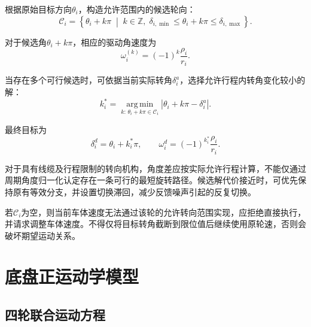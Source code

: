 \documentclass[UTF8,12pt,a4paper,openany]{ctexbook}
\begin{document}
根据原始目标方向$\theta_i$，构造允许范围内的候选轮向：
\begin{equation}
    \mathcal{C}_i
    =
    \left\{
        \theta_i+k\pi
        \;\middle|\;
        k\in\mathbb{Z},\;
        \delta_{i,\min}
        \leq\theta_i+k\pi
        \leq\delta_{i,\max}
    \right\}.
    \label{eq:kc-candidate-set}
\end{equation}

对于候选角$\theta_i+k\pi$，相应的驱动角速度为
\begin{equation}
    \omega_i^{(k)}
    =
    (-1)^k\frac{\rho_i}{r_i}.
    \label{eq:kc-candidate-speed}
\end{equation}

当存在多个可行候选时，可依据当前实际转角$\delta_i^{a}$，选择允许行程内转角变化较小的解：
\begin{equation}
    k_i^{*}
    =
    \underset{
        k:\,\theta_i+k\pi\in\mathcal{C}_i
    }{\operatorname{arg\,min}}
    \left|
        \theta_i+k\pi-\delta_i^{a}
    \right|.
    \label{eq:kc-angle-selection}
\end{equation}

最终目标为
\begin{equation}
    \delta_i^{d}=\theta_i+k_i^{*}\pi,
    \qquad
    \omega_i^{d}
    =
    (-1)^{k_i^{*}}\frac{\rho_i}{r_i}.
    \label{eq:kc-selected-inverse}
\end{equation}

对于具有线缆及行程限制的转向机构，角度差应按实际允许行程计算，不能仅通过周期角度归一化认定存在一条可行的最短旋转路径。候选解代价接近时，可优先保持原有等效分支，并设置切换滞回，减少反馈噪声引起的反复切换。

若$\mathcal{C}_i$为空，则当前车体速度无法通过该轮的允许转向范围实现，应拒绝直接执行，并请求调整车体速度。不得仅将目标转角截断到限位值后继续使用原轮速，否则会破坏期望运动关系。

\section{底盘正运动学模型}

\subsection{四轮联合运动方程}
\end{document}
